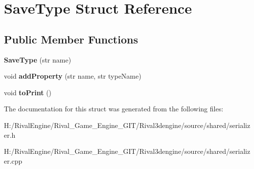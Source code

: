 \hypertarget{struct_save_type}{}\section{Save\+Type Struct Reference}
\label{struct_save_type}
\subsection*{Public Member Functions}
\begin{DoxyCompactItemize}
\item 
\mbox{\label{struct_save_type_a8a8abf578e57d9573f901a3b80f35ef5}} 
{\bfseries Save\+Type} (str name)
\item 
\mbox{\label{struct_save_type_a2575a34d1a2d5a5f4e3a23e13a093f26}} 
void {\bfseries add\+Property} (str name, str type\+Name)
\item 
\mbox{\label{struct_save_type_ab04d2cb897fc855e996a4d821661ed1f}} 
void {\bfseries to\+Print} ()
\end{DoxyCompactItemize}


The documentation for this struct was generated from the following files\+:\begin{DoxyCompactItemize}
\item 
H\+:/\+Rival\+Engine/\+Rival\+\_\+\+Game\+\_\+\+Engine\+\_\+\+G\+I\+T/\+Rival3dengine/source/shared/serializer.\+h\item 
H\+:/\+Rival\+Engine/\+Rival\+\_\+\+Game\+\_\+\+Engine\+\_\+\+G\+I\+T/\+Rival3dengine/source/shared/serializer.\+cpp\end{DoxyCompactItemize}
